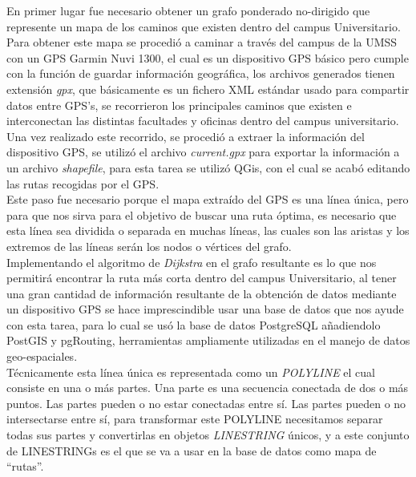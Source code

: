  En primer lugar fue necesario obtener un grafo ponderado no-dirigido que represente un mapa de los caminos que existen dentro del campus Universitario.\\

 Para obtener este mapa se procedió a caminar a través del campus de la UMSS con un GPS Garmin Nuvi 1300, el cual es un dispositivo GPS básico pero cumple con la función de guardar información geográfica, los archivos generados tienen extensión \emph{gpx}, que básicamente es un fichero XML estándar usado para compartir datos entre GPS's, se recorrieron los principales caminos que existen e interconectan las distintas facultades y oficinas dentro del campus universitario. Una vez realizado este recorrido, se procedió a extraer la información del dispositivo GPS, se utilizó el archivo \emph{current.gpx} para exportar la información  a un archivo \emph{shapefile}, para esta tarea se utilizó QGis, con el cual se acabó editando las rutas recogidas por el GPS.\\


 Este paso fue necesario porque el mapa extraído del GPS es una línea única, pero para que nos sirva para el objetivo de buscar una ruta óptima, es necesario que esta línea sea dividida o separada en muchas líneas, las cuales son las aristas y los extremos de las líneas serán los nodos o vértices del grafo.\\

 Implementando el algoritmo de \emph{Dijkstra} en el grafo resultante es lo que nos permitir\'a encontrar la ruta más corta dentro del campus Universitario, al tener una gran cantidad de información resultante de la obtención de datos mediante un dispositivo GPS se hace imprescindible usar una base de datos que nos ayude con esta tarea, para lo cual se usó la base de datos PostgreSQL añadiendolo PostGIS y pgRouting, herramientas ampliamente utilizadas en el manejo de datos geo-espaciales.\\



 Técnicamente esta línea única es representada como un \emph{POLYLINE} el cual consiste en una o más partes. Una parte es una secuencia conectada de dos o más puntos. Las partes pueden o no estar conectadas entre sí. Las partes pueden o no intersectarse entre sí, para transformar este POLYLINE necesitamos separar todas sus partes y convertirlas en objetos \emph{LINESTRING} únicos, y a este conjunto de LINESTRINGs es el que se va a usar en la base de datos como mapa de ``rutas''.\cite{esri_shapefile}\\

